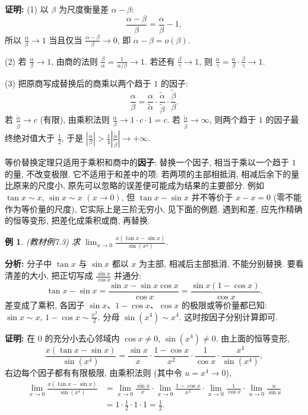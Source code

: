 \documentclass[UTF8,openany]{ctexbook}
\theoremstyle{chinesetextbook}
\newtheorem{example}{例}[section]
\newenvironment{cnproof}{\par\indent\textbf{证明:} \ignorespaces}{\par}
\begin{document}
\begin{cnproof}
(1) 以 $\beta$ 为尺度衡量差 $\alpha-\beta$:
\[
\frac{\alpha-\beta}{\beta}=\frac\alpha\beta-1,
\]
所以 $\displaystyle\frac\alpha\beta\to1$ 当且仅当 $\displaystyle\frac{\alpha-\beta}\beta\to0$, 即 $\alpha-\beta=o(\beta)$.

(2) 若 $\displaystyle\frac\alpha\beta\to1$, 由商的法则 $\displaystyle\frac\beta\alpha=\frac1{\alpha/\beta}\to1$. 若还有 $\displaystyle\frac\beta\gamma\to1$, 则 $\displaystyle\frac\alpha\gamma=\frac\alpha\beta\cdot\frac\beta\gamma\to1$.

(3) 把原商写成替换后的商乘以两个趋于 $1$ 的因子:
\[
\frac\alpha\beta
=\frac\alpha{\widetilde\alpha}\cdot
\frac{\widetilde\alpha}{\widetilde\beta}\cdot
\frac{\widetilde\beta}{\beta}.
\]
若 $\displaystyle\frac{\widetilde\alpha}{\widetilde\beta}\to c$ (有限), 由乘积法则 $\displaystyle\frac\alpha\beta\to1\cdot c\cdot1=c$. 若 $\displaystyle\frac{\widetilde\alpha}{\widetilde\beta}\to\infty$, 则两个趋于 $1$ 的因子最终绝对值大于 $\displaystyle\frac12$, 于是 $\displaystyle\left|\frac\alpha\beta\right|>\frac14\left|\frac{\widetilde\alpha}{\widetilde\beta}\right|\to+\infty$.
\end{cnproof}
等价替换定理只适用于乘积和商中的\textbf{因子}: 替换一个因子, 相当于乘以一个趋于 $1$ 的量, 不改变极限. 它不适用于和差中的项: 若两项的主部相抵消, 相减后余下的量比原来的尺度小, 原先可以忽略的误差便可能成为结果的主要部分. 例如 $\tan x\sim x$, $\sin x\sim x$ $(x\to0)$, 但 $\tan x-\sin x$ 并不等价于 $x-x=0$ (零不能作为等价量的尺度), 它实际上是三阶无穷小, 见下面的例题. 遇到和差, 应先作精确的恒等变形, 把差化成乘积或商, 再替换.
\begin{example}
\textnormal{(教材例7.3)} 求 $\displaystyle \lim_{x\to0}\frac{x(\tan x-\sin x)}{\sin(x^4)}$.
\end{example}
\par\indent\textbf{分析:} 分子中 $\tan x$ 与 $\sin x$ 都以 $x$ 为主部, 相减后主部抵消, 不能分别替换. 要看清差的大小, 把正切写成 $\displaystyle\frac{\sin x}{\cos x}$ 并通分:
\[
\tan x-\sin x=\frac{\sin x-\sin x\cos x}{\cos x}=\frac{\sin x(1-\cos x)}{\cos x}.
\]
差变成了乘积, 各因子 $\sin x$、$1-\cos x$、$\cos x$ 的极限或等价量都已知: $\sin x\sim x$, $1-\cos x\sim\frac{x^2}2$. 分母 $\sin(x^4)\sim x^4$. 这时按因子分别计算即可.
\begin{cnproof}
在 $0$ 的充分小去心邻域内 $\cos x\ne0$, $\sin(x^4)\ne0$. 由上面的恒等变形,
\[
\frac{x(\tan x-\sin x)}{\sin(x^4)}
=\frac{\sin x}{x}\cdot\frac{1-\cos x}{x^2}\cdot\frac1{\cos x}\cdot\frac{x^4}{\sin(x^4)},
\]
右边每个因子都有有限极限, 由乘积法则 (其中令 $u=x^4\to0$),
\[
\begin{aligned}
\lim_{x\to0}\frac{x(\tan x-\sin x)}{\sin(x^4)}
&=\lim_{x\to0}\frac{\sin x}x\cdot\lim_{x\to0}\frac{1-\cos x}{x^2}\cdot\lim_{x\to0}\frac1{\cos x}\cdot\lim_{u\to0}\frac{u}{\sin u}\\
&=1\cdot\frac12\cdot1\cdot1=\frac12.
\end{aligned}
\]
\end{cnproof}
\end{document}
